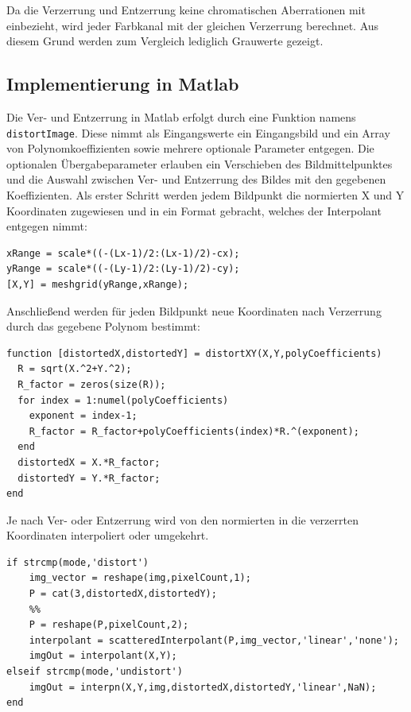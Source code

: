 Da die Verzerrung und Entzerrung keine chromatischen Aberrationen mit einbezieht, wird jeder Farbkanal mit der gleichen Verzerrung berechnet. Aus diesem Grund werden zum Vergleich lediglich Grauwerte gezeigt.

\subsection{Implementierung in Matlab}
Die Ver- und Entzerrung in Matlab erfolgt durch eine Funktion namens \texttt{distortImage}. Diese nimmt als Eingangswerte ein Eingangsbild und ein Array von Polynomkoeffizienten sowie mehrere optionale Parameter entgegen. Die optionalen Übergabeparameter erlauben ein Verschieben des Bildmittelpunktes und die Auswahl zwischen Ver- und Entzerrung des Bildes mit den gegebenen Koeffizienten. 
Als erster Schritt werden jedem Bildpunkt die normierten X und Y Koordinaten zugewiesen und in ein Format gebracht, welches der Interpolant entgegen nimmt:
\begin{lstlisting}[style=Matlab-editor,basicstyle=\mlttfamily]
%% Bestimmung der normierten X und Y-Koordinaten mit Center-Offset
xRange = scale*((-(Lx-1)/2:(Lx-1)/2)-cx);
yRange = scale*((-(Ly-1)/2:(Ly-1)/2)-cy);
[X,Y] = meshgrid(yRange,xRange);
\end{lstlisting}
Anschließend werden für jeden Bildpunkt neue Koordinaten nach Verzerrung durch das gegebene Polynom bestimmt:
\begin{lstlisting}[style=Matlab-editor,basicstyle=\mlttfamily]
%% Berechne das Verzerrungspolynom und verzerrte XY Coordinaten
function [distortedX,distortedY] = distortXY(X,Y,polyCoefficients)
  R = sqrt(X.^2+Y.^2);
  R_factor = zeros(size(R));
  for index = 1:numel(polyCoefficients)
    exponent = index-1;
    R_factor = R_factor+polyCoefficients(index)*R.^(exponent);
  end
  distortedX = X.*R_factor;
  distortedY = Y.*R_factor;
end
\end{lstlisting}
Je nach Ver- oder Entzerrung wird von den normierten in die verzerrten Koordinaten interpoliert oder umgekehrt.
\begin{lstlisting}[style=Matlab-editor,basicstyle=\mlttfamily]
%% Berechnung der X,Y Position nach Ver/Entzerrung
if strcmp(mode,'distort')
	img_vector = reshape(img,pixelCount,1);
	P = cat(3,distortedX,distortedY);
	%%
	P = reshape(P,pixelCount,2);
	interpolant = scatteredInterpolant(P,img_vector,'linear','none');
	imgOut = interpolant(X,Y);
elseif strcmp(mode,'undistort')
	imgOut = interpn(X,Y,img,distortedX,distortedY,'linear',NaN);
end
\end{lstlisting}



